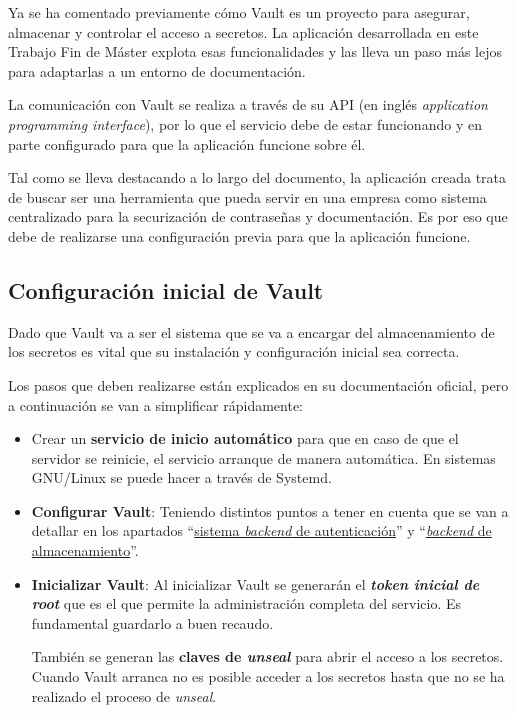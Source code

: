 \documentclass{\ClassPath/viu-tfm-template}
\begin{document}
Ya se ha comentado previamente cómo Vault es un proyecto para asegurar, almacenar y controlar el acceso a secretos. La aplicación desarrollada en este Trabajo Fin de Máster explota esas funcionalidades y las lleva un paso más lejos para adaptarlas a un entorno de documentación.

La comunicación con Vault se realiza a través de su API (en inglés \textit{application programming interface}), por lo que el servicio debe de estar funcionando y en parte configurado para que la aplicación funcione sobre él.

Tal como se lleva destacando a lo largo del documento, la aplicación creada trata de buscar ser una herramienta que pueda servir en una empresa como sistema centralizado para la securización de contraseñas y documentación. Es por eso que debe de realizarse una configuración previa para que la aplicación funcione.

\subsection{Configuración inicial de Vault}

Dado que Vault va a ser el sistema que se va a encargar del almacenamiento de los secretos es vital que su instalación y configuración inicial sea correcta.

Los pasos que deben realizarse están explicados en su documentación oficial, pero a continuación se van a simplificar rápidamente:

\begin{itemize}
    \item Crear un \textbf{servicio de inicio automático} para que en caso de que el servidor se reinicie, el servicio arranque de manera automática. En sistemas GNU/Linux se puede hacer a través de Systemd.
    \item \textbf{Configurar Vault}: Teniendo distintos puntos a tener en cuenta que se van a detallar en los apartados “\hyperlink{sistema_backend}{sistema \textit{backend} de autenticación}” y “\hyperlink{backend_almacenamiento}{\textit{backend} de almacenamiento}”.
    \item \textbf{Inicializar Vault}: Al inicializar Vault se generarán el \textit{\textbf{token inicial de root}} que es el que permite la administración completa del servicio. Es fundamental guardarlo a buen recaudo.

    También se generan las \textbf{claves de \textit{unseal}} para abrir el acceso a los secretos. Cuando Vault arranca no es posible acceder a los secretos hasta que no se ha realizado el proceso de \textit{unseal}.
\end{itemize}
\end{document}
